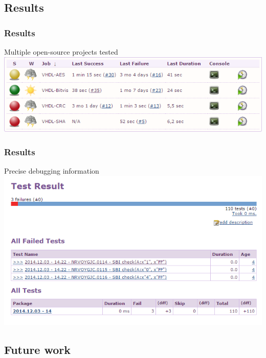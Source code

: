\documentclass[british,10pt]{beamer}
\begin{document}
\subsection{Results}
\begin{frame}\frametitle{Results}
Multiple open-source projects tested
\vskip10pt
{\centering
\includegraphics[width=\textwidth]{images/jobs.png}}
\end{frame}


\begin{frame}\frametitle{Results}
Precise debugging information
{\centering
\includegraphics[width=.95\textwidth]{images/results1.png}}
\end{frame}
\subsection{Future work}
\end{document}
